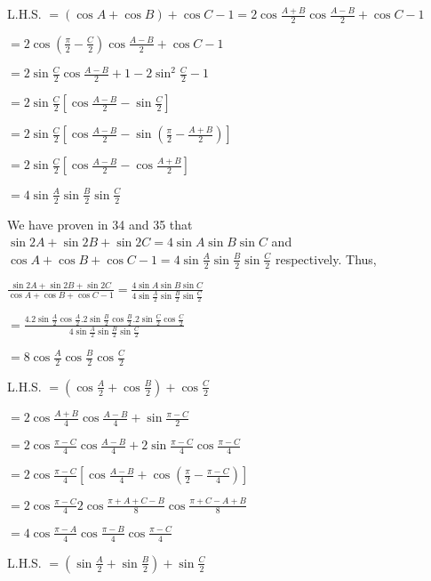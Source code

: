 \item L.H.S. $= (\cos A + \cos B) + \cos C - 1 = 2\cos\frac{A + B}{2}\cos\frac{A - B}{2} + \cos C - 1$

  $= 2\cos\left(\frac{\pi}{2} - \frac{C}{2}\right)\cos\frac{A - B}{2} + \cos C - 1$

  $= 2\sin\frac{C}{2}\cos\frac{A - B}{2} + 1 - 2\sin^2\frac{C}{2} - 1$

  $= 2\sin\frac{C}{2}\left[\cos\frac{A - B}{2} - \sin\frac{C}{2}\right]$

  $= 2\sin\frac{C}{2}\left[\cos\frac{A - B}{2} - \sin\left(\frac{\pi}{2} - \frac{A + B}{2}\right)\right]$

  $= 2\sin\frac{C}{2}\left[\cos\frac{A - B}{2} - \cos\frac{A + B}{2}\right]$

  $= 4\sin\frac{A}{2}\sin\frac{B}{2}\sin\frac{C}{2}$

\item We have proven in 34 and 35 that $\sin 2A + \sin 2B + \sin 2C = 4\sin A\sin B\sin C$ and $\cos A + \cos B + \cos
  C - 1 = 4\sin\frac{A}{2}\sin\frac{B}{2}\sin\frac{C}{2}$ respectively. Thus,

  $\frac{\sin 2A + \sin 2B + \sin 2C}{\cos A + \cos B + \cos C - 1} = \frac{4\sin A\sin B\sin
    C}{4\sin\frac{A}{2}\sin\frac{B}{2}\sin\frac{C}{2}}$

  $=
  \frac{4.2\sin\frac{A}{2}\cos\frac{A}{2}.2\sin\frac{B}{2}\cos\frac{B}{2}.2\sin\frac{C}{2}\cos\frac{C}{2}}{4\sin\frac{A}{2}\sin\frac{B}{2}\sin\frac{C}{2}}$

  $= 8\cos\frac{A}{2}\cos\frac{B}{2}\cos\frac{C}{2}$

\item L.H.S. $= \left(\cos \frac{A}{2} + \cos\frac{B}{2}\right) + \cos\frac{C}{2}$

  $= 2\cos\frac{A + B}{4}\cos\frac{A - B}{4} + \sin\frac{\pi - C}{2}$

  $= 2\cos\frac{\pi - C}{4}\cos\frac{A - B}{4} + 2\sin\frac{\pi - C}{4}\cos\frac{\pi - C}{4}$

  $= 2\cos\frac{\pi - C}{4}\left[\cos\frac{A - B}{4} + \cos\left(\frac{\pi}{2} - \frac{\pi - C}{4}\right)\right]$

  $= 2\cos\frac{\pi - C}{4}2\cos\frac{\pi + A + C - B}{8}\cos\frac{\pi + C - A + B}{8}$

  $= 4\cos\frac{\pi - A}{4}\cos\frac{\pi - B}{4}\cos\frac{\pi - C}{4}$

\item L.H.S. $= \left(\sin\frac{A}{2} + \sin \frac{B}{2}\right) + \sin\frac{C}{2}$

